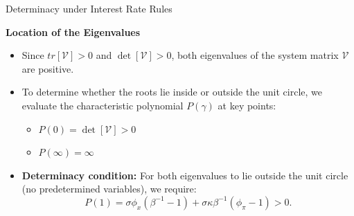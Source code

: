 \documentclass[11pt,aspectratio=169]{beamer}
\begin{document}
\begin{frame}{Determinacy under Interest Rate Rules}
\small

\textbf{Location of the Eigenvalues}
\begin{itemize}
    \item Since $tr[\mathcal{V}] > 0$ and $\det[\mathcal{V}] > 0$, both eigenvalues of the system matrix $\mathcal{V}$ are positive.
    
    \item To determine whether the roots lie inside or outside the unit circle, we evaluate the characteristic polynomial $P(\gamma)$ at key points:
    \begin{itemize}
        \item $P(0) = \det[\mathcal{V}] > 0$
        \item $P(\infty) = \infty$
    \end{itemize}

    \item \textbf{Determinacy condition:} For both eigenvalues to lie outside the unit circle (no predetermined variables), we require:
    \begin{equation}
    P(1)
    = \sigma \phi_x(\beta^{-1}-1)
    + \sigma \kappa \beta^{-1}(\phi_\pi - 1)
    > 0.
    \label{TaylorPrinciple}
    \end{equation}
\end{itemize}

\end{frame}
\end{document}
